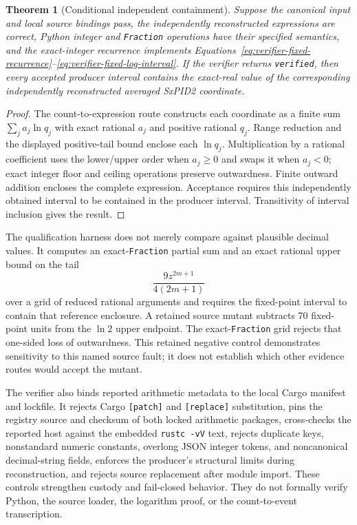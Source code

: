 \documentclass[11pt]{article}
\newtheorem{theorem}{Theorem}[section]
\theoremstyle{definition}
\begin{document}
\begin{theorem}[Conditional independent containment]
Suppose the canonical input and local source bindings pass, the independently reconstructed
expressions are correct, Python integer and \texttt{Fraction} operations have their specified
semantics, and the exact-integer recurrence implements
Equations~\eqref{eq:verifier-fixed-recurrence}--\eqref{eq:verifier-fixed-log-interval}.
If the verifier returns \texttt{verified}, then every accepted producer interval contains the
exact-real value of the corresponding independently reconstructed averaged SxPID2 coordinate.
\end{theorem}

\begin{proof}
The count-to-expression route constructs each coordinate as a finite sum
$\sum_j a_j\ln q_j$ with exact rational $a_j$ and positive rational $q_j$.  Range reduction and
the displayed positive-tail bound enclose each $\ln q_j$.  Multiplication by a rational
coefficient uses the lower/upper order when $a_j\ge0$ and swaps it when $a_j<0$; exact integer
floor and ceiling operations preserve outwardness.  Finite outward addition encloses the complete
expression.  Acceptance requires this independently obtained interval to be contained in the
producer interval.  Transitivity of interval inclusion gives the result.
\end{proof}

The qualification harness does not merely compare against plausible decimal values.  It computes
an exact-\texttt{Fraction} partial sum and an exact rational upper bound on the tail
\[
  \frac{9z^{2m+1}}{4(2m+1)}
\]
over a grid of reduced rational arguments and requires the fixed-point interval to contain that
reference enclosure.  A retained source mutant subtracts 70 fixed-point units from the
$\ln 2$ upper endpoint.  The exact-\texttt{Fraction} grid rejects that one-sided loss of
outwardness.  This retained negative control demonstrates sensitivity to this named source fault;
it does not establish which other evidence routes would accept the mutant.

The verifier also binds reported arithmetic metadata to the local Cargo manifest and lockfile.  It
rejects Cargo \texttt{[patch]} and \texttt{[replace]} substitution, pins the registry source and
checksum of both locked arithmetic packages, cross-checks the reported host against the embedded
\texttt{rustc -vV} text, rejects duplicate keys, nonstandard numeric constants, overlong JSON
integer tokens, and noncanonical decimal-string fields, enforces the producer's structural limits
during reconstruction, and rejects source replacement after module import.  These controls
strengthen custody and fail-closed behavior.  They do not formally verify Python, the source
loader, the logarithm proof, or the count-to-event transcription.
\end{document}
